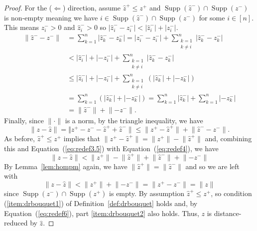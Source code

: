 \documentclass[10pt,a4paper]{amsart}
\begin{document}
\begin{proof}
    \smallskip
    For the ($\Leftarrow$) direction, assume $\hat z^+ \le z^+$ and $\operatorname{Supp}(\hat z^{-}) \cap \operatorname{Supp}(z^{-})$ is non-empty meaning we have $i \in \operatorname{Supp}(\hat z^{-}) \cap \operatorname{Supp}(z^{-})$ for some $i \in [n]$. This means $z_i^->0$ and $\hat z^-_i>0$ so $|\hat z_i^- - z_i^- |<|\hat z_i^-| + |z_i^-|$.
    \begin{align} \label{eq:redef3.5}
        \lVert \hat z^{-} - z^{-} \rVert&=\sum_{k=1}^n |\hat z_k^{-}-z_k^{-}|=|\hat z^{-}_i- z^{-}_i|+\sum_{\substack{k =1 \\ k \neq i}}^n |\hat z^{-}_k-z^{-}_k| \\ \nonumber
        &<|\hat z^{-}_i|+|-z^{-}_i|+\sum_{\substack{k =1 \\ k \neq i}}^n |\hat z^{-}_k-z^{-}_k| \\ \nonumber
        &\le |\hat z^{-}_i|+|-z^{-}_i|+\sum_{\substack{k =1 \\ k \neq i}}^n \left(|\hat z^{-}_k|+|-z^{-}_k|\right) \\ \nonumber
        &=\sum_{k =1}^n \left(|\hat z^{-}_k|+|-z^{-}_k|\right)=\sum_{k =1}^n |\hat z^{-}_k|+\sum_{k =1}^n|-z^{-}_k|\\ \nonumber
        &=\lVert \hat z^{-} \rVert + \lVert -z^{-} \rVert.
    \end{align}
    Finally, since $\lVert \cdot \rVert$ is a norm, by the triangle inequality, we have
    \begin{equation}\label{eq:redef4}
         \lVert z - \hat z \rVert=\Vert  z^{+}- z^{-} -  \hat z^{+} + \hat z^{-} \rVert \le \lVert  z^{+} -  \hat z^{+} \rVert + \lVert \hat z^{-} - z^{-} \rVert.
    \end{equation}
   As before, $\hat z^{+} \le z^{+}$ implies that $\lVert z^{+} - \hat z^{+} \rVert = \lVert z^{+} \rVert - \lVert \hat z^{+} \rVert$ and, combining this and Equation~(\ref{eq:redef3.5}) with Equation~(\ref{eq:redef4}), we have
   \begin{equation} \label{eq:redef5}
       \lVert z - \hat z \rVert<  \lVert  z^{+} \rVert - \lVert  \hat z^{+} \rVert + \lVert \hat z^{-} \rVert +\lVert - z^{-} \rVert
   \end{equation}
   By Lemma~\ref{lem:hompm} again, we have $\lVert \hat z^+ \rVert = \lVert \hat z^- \rVert$ and so we are left with
     \begin{equation}  \label{eq:redef6}
       \lVert z - \hat z \rVert<  \lVert  z^{+} \rVert + \lVert -z^{-} \rVert=\lVert  z^{+} - z^{-} \rVert=\lVert z \rVert
   \end{equation}
    since $\operatorname{Supp}(z^{-}) \cap \operatorname{Supp}(z^{+})$ is empty. By assumption $\hat z^+ \le z^+$, so condition (\ref{item:drbouquet1}) of Definition~\ref{def:drbouquet} holds and, by Equation~(\ref{eq:redef6}), part \ref{item:drbouquet2} also holds. Thus, $z$ is distance-reduced by $\hat z$.
\end{proof}
\end{document}
